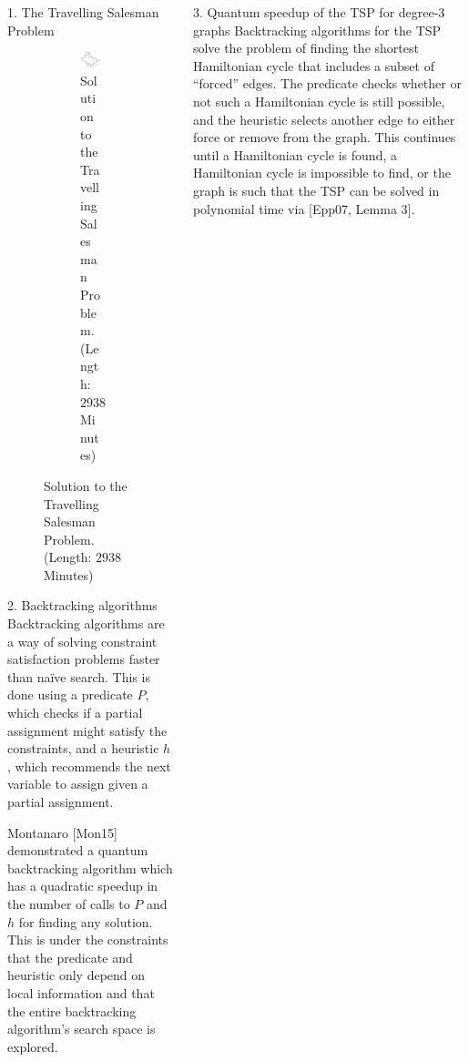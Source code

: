 \documentclass[]{templates/poster}
\begin{document}
\begin{frame}{}
\begin{columns}[t]
\begin{column}{0.422\linewidth}
\begin{block}{\Large 1. The Travelling Salesman Problem}
\begin{center}
\begin{figure}
\begin{subfigure}[t]{0.3\linewidth}
  \includegraphics[width=\linewidth]{shortest}
  \caption{ Solution to the Travelling Salesman Problem. (Length: $2938$ Minutes)}
  \end{subfigure}
  \end{figure}
  \end{center}
  \end{block}

  \begin{block}{\Large 2. Backtracking algorithms}
  Backtracking algorithms are a way of solving constraint satisfaction problems faster than na\"ive search. This is done using a predicate $P$, which checks if a partial assignment might satisfy the constraints, and a heuristic $h$, which recommends the next variable to assign given a partial assignment.
  
  Montanaro [Mon15] demonstrated a quantum backtracking algorithm which has a quadratic speedup in the number of calls to $P$ and $h$ for finding any solution. This is under the constraints that the predicate and heuristic only depend on local information and that the entire backtracking algorithm's search space is explored.
  \end{block}
  \end{column}

  \begin{column}{0.422\linewidth}
  \begin{block}{\Large 3. Quantum speedup of the TSP for degree-3 graphs}
  Backtracking algorithms for the TSP solve the problem of finding the shortest Hamiltonian cycle that includes a subset of ``forced'' edges. The predicate checks whether or not such a Hamiltonian cycle is still possible, and the heuristic selects another edge to either force or remove from the graph. This continues until a Hamiltonian cycle is found, a Hamiltonian cycle is impossible to find, or the graph is such that the TSP can be solved in polynomial time via [Epp07, Lemma 3].


\end{block}
\end{column}
\end{columns}
\end{frame}
\end{document}
